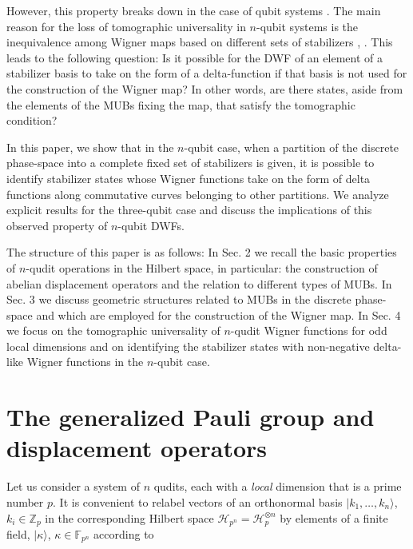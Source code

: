 \documentclass[quantumrep,article,submit,pdftex,moreauthors]{Definitions/mdpi}
\begin{document}
However, this property breaks down in the case of qubit systems \cite{UniqueWF,
cohomo,contextMagic}. The main reason for the loss of tomographic universality
in $n$-qubit systems is the inequivalence among Wigner maps based on different
sets of stabilizers \cite{Bjork2007}, \cite{qip17}. This leads to the following
question: Is it possible for the DWF of an element of a stabilizer basis to take
on the form of a delta-function if that basis is not used for the construction
of the Wigner map? In other words, are there states, aside from the elements of
the MUBs fixing the map, that satisfy the tomographic condition?

In this paper, we show that in the $n$-qubit case, when a partition of the
discrete phase-space into a complete fixed set of stabilizers is given, it is
possible to identify stabilizer states whose Wigner functions take on the form
of delta functions along commutative curves belonging to other partitions. We
analyze explicit results for the three-qubit case and discuss the implications
of this observed property of $n$-qubit DWFs.

{\color{teal}The structure of this paper is as follows: In Sec. 2 we recall the
  basic properties of $n$-qudit operations in the Hilbert space, in particular:
  the construction of abelian displacement operators and the relation to
  different types of MUBs. In Sec. 3 we discuss geometric structures related to
  MUBs in the discrete phase-space and which are employed for the construction
of the Wigner map. In Sec. 4 we focus on the tomographic universality of
$n$-qudit Wigner functions for odd local dimensions and on identifying the
stabilizer states with non-negative delta-like Wigner functions in the $n$-qubit
case.}


\section{The generalized Pauli group and displacement operators}

Let us consider a system of $n$ qudits, each with a \textit{local} dimension
that is a prime number $p$. It is convenient to relabel vectors of an
orthonormal basis $|k_{1}, \ldots, k_{n}\rangle$, $k_{i}\in \mathbb{Z}_{p}$ in
the corresponding Hilbert space $\mathcal{H}_{p^{n}}=\mathcal{H}_{p}^{\otimes
n}$ by elements of a finite field, $|\kappa \rangle$, $\kappa \in
\mathbb{F}_{p^{n}}$ according to
\end{document}
